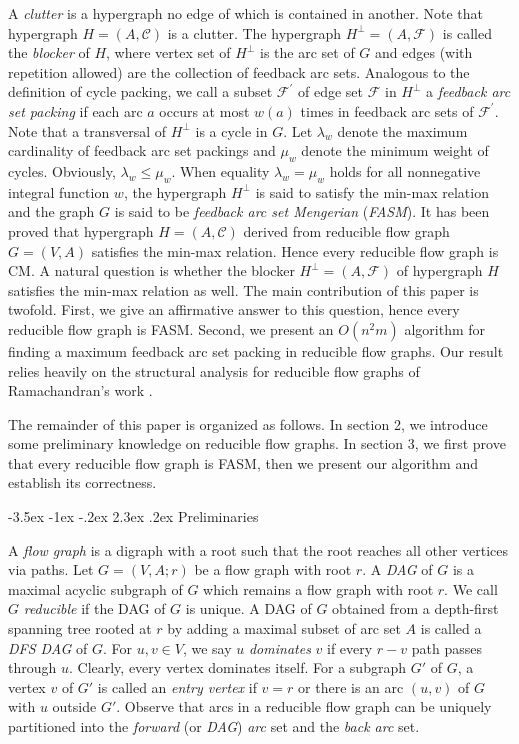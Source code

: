 \documentclass[11pt]{article}
\makeatletter
\renewcommand\section{%
  \@startsection{section}{1}
                {\z@}%
                {-3.5ex \@plus -1ex \@minus -.2ex}%
                {2.3ex \@plus.2ex}%
                {\large\bfseries}%
}
\makeatother
\begin{document}
A \emph{clutter} is a hypergraph no edge of which is contained in another. Note that hypergraph $H=(A,\mathcal{C})$ is a clutter. The hypergraph $H^\perp=(A,\mathcal{F})$ is called the \emph{blocker} of $H$, where vertex set of $H^\perp$ is the arc set of $G$ and edges (with repetition allowed) are the collection of feedback arc sets. Analogous to the definition of cycle packing, we call a subset $\mathcal{F}^\prime$ of edge set $\mathcal{F}$ in $H^\perp$ a \emph{feedback arc set packing} if each arc $a$ occurs at most $w(a)$ times in feedback arc sets of $\mathcal{F}^\prime$. Note that a transversal of $H^\perp$ is a cycle in $G$. Let $\lambda_w$ denote the maximum cardinality of feedback arc set packings and $\mu_w$ denote the minimum weight of cycles. Obviously, $\lambda_w\leq\mu_w$. When equality $\lambda_w=\mu_w$ holds for all nonnegative integral function $w$, the hypergraph $H^\perp$ is said to satisfy the min-max relation and the graph $G$ is said to be \emph{feedback arc set Mengerian} (\emph{FASM}). It has been proved that hypergraph $H=(A,\mathcal{C})$ derived from reducible flow graph $G=(V,A)$ satisfies the min-max relation. Hence every reducible flow graph is CM. A natural question is whether the blocker $H^\perp=(A,\mathcal{F})$ of hypergraph $H$ satisfies the min-max relation as well. The main contribution of this paper is twofold. First, we give an affirmative answer to this question, hence every reducible flow graph is FASM. Second, we present an $O(n^2 m)$ algorithm for finding a maximum feedback arc set packing in reducible flow graphs. Our result relies heavily on the structural analysis for reducible flow graphs of Ramachandran's work \cite{Rama1,Rama2}.

The remainder of this paper is organized as follows. In section 2, we introduce some preliminary knowledge on reducible flow graphs. In section 3, we first prove that every reducible flow graph is FASM, then we present our algorithm and establish its correctness.

\section{Preliminaries}
\label{prel}

A \emph{flow graph} is a digraph with a root such that the root reaches all other vertices via paths.
Let $G=(V,A;r)$ be a flow graph with root $r$. 
A \emph{DAG} of $G$ is a maximal acyclic subgraph of $G$ which remains a flow graph with root $r$. We call $G$ \emph{reducible} if the DAG of $G$ is unique. A DAG of $G$ obtained from a depth-first spanning tree rooted at $r$ by adding a maximal subset of arc set $A$ is called a \emph{DFS DAG} of $G$.
For $u,v\in V$, we say $u$ \emph{dominates} $v$ if every $r-v$ path passes through $u$. Clearly, every vertex dominates itself. For a subgraph $G'$ of $G$, a vertex $v$ of $G'$ is called an \emph{entry vertex} if $v=r$ or there is an arc $(u,v)$ of $G$ with $u$ outside $G'$.  Observe that arcs in a reducible flow graph can be uniquely partitioned into the \emph{forward} (or \emph{DAG}) \emph{arc} set and the \emph{back arc} set.
\end{document}
